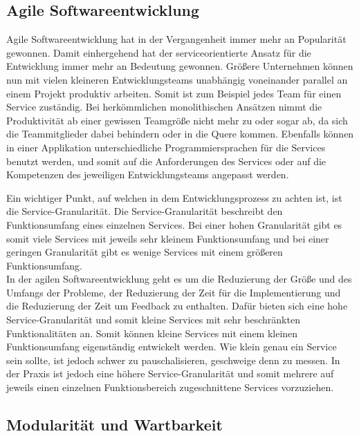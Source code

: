 \subsection{Agile Softwareentwicklung}
\label{sec:agileDevelopment}

Agile Softwareentwicklung hat in der Vergangenheit immer mehr an Popularität gewonnen. Damit einhergehend hat der serviceorientierte Ansatz für die Entwicklung immer mehr an Bedeutung gewonnen. Größere Unternehmen können nun mit vielen kleineren Entwicklungsteams unabhängig voneinander parallel an einem Projekt produktiv arbeiten. Somit ist zum Beispiel jedes Team für einen Service zuständig. Bei herkömmlichen monolithischen Ansätzen nimmt die Produktivität ab einer gewissen Teamgröße nicht mehr zu oder sogar ab, da sich die Teammitglieder dabei behindern oder in die Quere kommen. Ebenfalls können in einer Applikation unterschiedliche Programmiersprachen für die Services benutzt werden, und somit auf die Anforderungen des Services oder auf die Kompetenzen des jeweiligen Entwicklungsteams angepasst werden. 

Ein wichtiger Punkt, auf welchen in dem Entwicklungsprozess zu achten ist, ist die Service-Granularität. Die Service-Granularität beschreibt den Funktionsumfang eines einzelnen Services. Bei einer hohen Granularität gibt es somit viele Services mit jeweils sehr kleinem Funktionsumfang und bei einer geringen Granularität gibt es wenige Services mit einem größeren Funktionsumfang.\\
In der agilen Softwareentwicklung geht es um die Reduzierung der Größe und des Umfangs der Probleme, der Reduzierung der Zeit für die Implementierung und die Reduzierung der Zeit um Feedback zu enthalten. Dafür bieten sich eine hohe Service-Granularität und somit kleine Services mit sehr beschränkten Funktionalitäten an. Somit können kleine Services mit einem kleinen Funktionsumfang eigenständig entwickelt werden. Wie klein genau ein Service sein sollte, ist jedoch schwer zu pauschalisieren, geschweige denn zu messen. In der Praxis ist jedoch eine höhere Service-Granularität und somit mehrere auf jeweils einen einzelnen Funktionsbereich zugeschnittene Services vorzuziehen. \cite{NADAREISHVILI.2016}


\subsection{Modularität und Wartbarkeit}
\label{sec:modularity}

